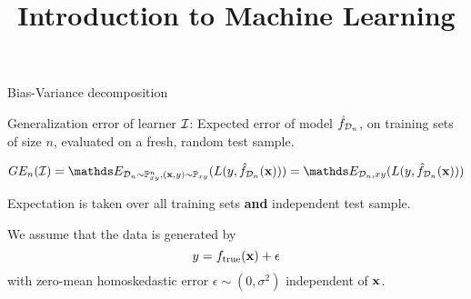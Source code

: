 \documentclass[11pt,compress,t,notes=noshow, xcolor=table]{beamer}
\title{Introduction to Machine Learning}
\begin{document}
    

\begin{frame}{Bias-Variance decomposition}

Generalization error of learner  $\mathcal{I}$: 
Expected error of model $\hat{f}_{\mathcal{D}_n}$, on training sets of size $n$, evaluated on a fresh, random test sample.

$$GE_n(\ind) = \E_{\D_n \sim \Pxy^n, (\xv, y) \sim \Pxy}( L(y, \fh_{\D_n}(\xv)) ) = \E_{\D_n, xy}( L(y, \fh_{\D_n}(\xv)) )  $$

\vfill 

  Expectation is taken over all training sets \textbf{and} independent test sample.\\

\vfill 

We assume that the data is generated by 
$$
y = f_{\text{true}}(\mathbf{x}) + \epsilon
$$
with zero-mean homoskedastic error $\epsilon \sim (0, \sigma^2)$ independent of $\mathbf{x}$.  

\end{frame}
\end{document}
